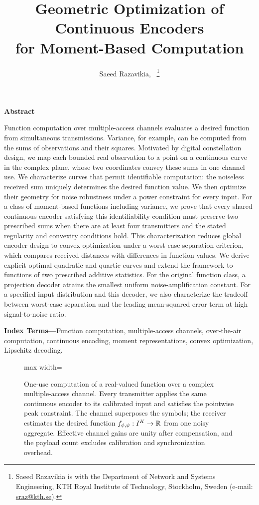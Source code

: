 \documentclass[journal,12pt,onecolumn,draftclsnofoot,letterpaper]{IEEEtran}
\title{Geometric Optimization of Continuous Encoders\\for Moment-Based Computation}
\author{Saeed Razavikia,~\IEEEmembership{Member,~IEEE} \thanks{Saeed Razavikia is with the Department of Network and Systems Engineering, KTH Royal Institute of Technology, Stockholm, Sweden (e-mail: \href{mailto:sraz@kth.se}{sraz@kth.se}).}}
\let\footnotesize\normalsize
\renewenvironment{abstract}{\par%
    \noindent\textbf{Abstract}\par\noindent\ignorespaces}%
    {\par\addvspace{0.5\baselineskip}}
\renewenvironment{IEEEkeywords}{\begin{samepage}\par\noindent
    \textbf{Index Terms---}\ignorespaces}%
    {\par\end{samepage}\addvspace{0.5\baselineskip}}
\newcommand{\paperfigure}[1]{\begingroup
    \def\baselinestretch{1}%
    \renewcommand{\footnotesize}{\fontsize{8}{9.5}\selectfont}%
    \renewcommand{\scriptsize}{\fontsize{7}{8}\selectfont}%
    \begin{adjustbox}{max width=\linewidth}\end{adjustbox}%
    \endgroup}
\newcommand{\paperfigure}[1]{%
    \begin{adjustbox}{max width=\linewidth}\end{adjustbox}}
\theoremstyle{remark}\newtheorem{remark}{Remark}
\begin{document}
\maketitle
\begin{abstract}
Function computation over multiple-access channels evaluates a desired function from simultaneous transmissions. Variance, for example, can be computed from the sums of observations and their squares. Motivated by digital constellation design, we map each bounded real observation to a point on a continuous curve in the complex plane, whose two coordinates convey these sums in one channel use. We characterize curves that permit identifiable computation: the noiseless received sum uniquely determines the desired function value. We then optimize their geometry for noise robustness under a power constraint for every input. For a class of moment-based functions including variance, we prove that every shared continuous encoder satisfying this identifiability condition must preserve two prescribed sums when there are at least four transmitters and the stated regularity and convexity conditions hold. This characterization reduces global encoder design to convex optimization under a worst-case separation criterion, which compares received distances with differences in function values. We derive explicit optimal quadratic and quartic curves and extend the framework to functions of two prescribed additive statistics. For the original function class, a projection decoder attains the smallest uniform noise-amplification constant. For a specified input distribution and this decoder, we also characterize the tradeoff between worst-case separation and the leading mean-squared error term at high signal-to-noise ratio.
\end{abstract}
\begin{IEEEkeywords}Function computation, multiple-access channels, over-the-air computation, continuous encoding, moment representations, convex optimization, Lipschitz decoding.\end{IEEEkeywords}
\begin{figure}[t]
 \centering\paperfigure{figures/tikz/system_model}
 \caption{One-use computation of a real-valued function over a complex multiple-access channel. Every transmitter applies the same continuous encoder to its calibrated input and satisfies the pointwise peak constraint. The channel superposes the symbols; the receiver estimates the desired function $f_{\phi,\psi}:I^K\to\mathbb R$ from one noisy aggregate. Effective channel gains are unity after compensation, and the payload count excludes calibration and synchronization overhead.}
 \label{fig:system}
\end{figure}
\end{document}
